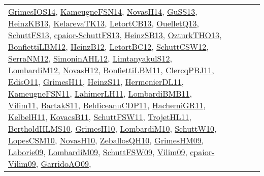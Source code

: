 {\begin{longtable}{lp{3cm}>{\raggedright}p{6cm}>{\raggedright}p{6cm}p{8cm}}
\href{articles/GrimesIOS14.pdf}{GrimesIOS14}\cite{GrimesIOS14}, \href{articles/KameugneFSN14.pdf}{KameugneFSN14}\cite{KameugneFSN14}, \href{articles/NovasH14.pdf}{NovasH14}\cite{NovasH14}, \href{papers/GuSS13.pdf}{GuSS13}\cite{GuSS13}, \href{papers/HeinzKB13.pdf}{HeinzKB13}\cite{HeinzKB13}, \href{papers/KelarevaTK13.pdf}{KelarevaTK13}\cite{KelarevaTK13}, \href{papers/LetortCB13.pdf}{LetortCB13}\cite{LetortCB13}, \href{papers/OuelletQ13.pdf}{OuelletQ13}\cite{OuelletQ13}, \href{papers/SchuttFS13.pdf}{SchuttFS13}\cite{SchuttFS13}, \href{papers/cpaior-SchuttFS13.pdf}{cpaior-SchuttFS13}\cite{cpaior-SchuttFS13}, \href{articles/HeinzSB13.pdf}{HeinzSB13}\cite{HeinzSB13}, \href{articles/OzturkTHO13.pdf}{OzturkTHO13}\cite{OzturkTHO13}, \href{papers/BonfiettiLBM12.pdf}{BonfiettiLBM12}\cite{BonfiettiLBM12}, \href{papers/HeinzB12.pdf}{HeinzB12}\cite{HeinzB12}, \href{papers/LetortBC12.pdf}{LetortBC12}\cite{LetortBC12}, \href{papers/SchuttCSW12.pdf}{SchuttCSW12}\cite{SchuttCSW12}, \href{papers/SerraNM12.pdf}{SerraNM12}\cite{SerraNM12}, \href{papers/SimoninAHL12.pdf}{SimoninAHL12}\cite{SimoninAHL12}, \href{articles/LimtanyakulS12.pdf}{LimtanyakulS12}\cite{LimtanyakulS12}, \href{articles/LombardiM12.pdf}{LombardiM12}\cite{LombardiM12}, \href{articles/NovasH12.pdf}{NovasH12}\cite{NovasH12}, \href{papers/BonfiettiLBM11.pdf}{BonfiettiLBM11}\cite{BonfiettiLBM11}, \href{papers/ClercqPBJ11.pdf}{ClercqPBJ11}\cite{ClercqPBJ11}, \href{papers/EdisO11.pdf}{EdisO11}\cite{EdisO11}, \href{papers/GrimesH11.pdf}{GrimesH11}\cite{GrimesH11}, \href{papers/HeinzS11.pdf}{HeinzS11}\cite{HeinzS11}, \href{papers/HermenierDL11.pdf}{HermenierDL11}\cite{HermenierDL11}, \href{papers/KameugneFSN11.pdf}{KameugneFSN11}\cite{KameugneFSN11}, \href{papers/LahimerLH11.pdf}{LahimerLH11}\cite{LahimerLH11}, \href{papers/LombardiBMB11.pdf}{LombardiBMB11}\cite{LombardiBMB11}, \href{papers/Vilim11.pdf}{Vilim11}\cite{Vilim11}, \href{articles/BartakS11.pdf}{BartakS11}\cite{BartakS11}, \href{articles/BeldiceanuCDP11.pdf}{BeldiceanuCDP11}\cite{BeldiceanuCDP11}, \href{articles/HachemiGR11.pdf}{HachemiGR11}\cite{HachemiGR11}, \href{articles/KelbelH11.pdf}{KelbelH11}\cite{KelbelH11}, \href{articles/KovacsB11.pdf}{KovacsB11}\cite{KovacsB11}, \href{articles/SchuttFSW11.pdf}{SchuttFSW11}\cite{SchuttFSW11}, \href{articles/TrojetHL11.pdf}{TrojetHL11}\cite{TrojetHL11}, \href{papers/BertholdHLMS10.pdf}{BertholdHLMS10}\cite{BertholdHLMS10}, \href{papers/GrimesH10.pdf}{GrimesH10}\cite{GrimesH10}, \href{papers/LombardiM10.pdf}{LombardiM10}\cite{LombardiM10}, \href{papers/SchuttW10.pdf}{SchuttW10}\cite{SchuttW10}, \href{articles/LopesCSM10.pdf}{LopesCSM10}\cite{LopesCSM10}, \href{articles/NovasH10.pdf}{NovasH10}\cite{NovasH10}, \href{articles/ZeballosQH10.pdf}{ZeballosQH10}\cite{ZeballosQH10}, \href{papers/GrimesHM09.pdf}{GrimesHM09}\cite{GrimesHM09}, \href{papers/Laborie09.pdf}{Laborie09}\cite{Laborie09}, \href{papers/LombardiM09.pdf}{LombardiM09}\cite{LombardiM09}, \href{papers/SchuttFSW09.pdf}{SchuttFSW09}\cite{SchuttFSW09}, \href{papers/Vilim09.pdf}{Vilim09}\cite{Vilim09}, \href{papers/cpaior-Vilim09.pdf}{cpaior-Vilim09}\cite{cpaior-Vilim09}, \href{articles/GarridoAO09.pdf}{GarridoAO09}\cite{GarridoAO09}, 
\end{longtable}}
